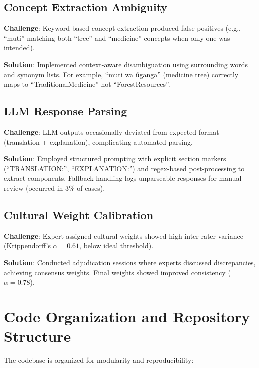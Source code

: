 \subsection{Concept Extraction Ambiguity}
\label{subsec:concept_ambiguity}

\textbf{Challenge}: Keyword-based concept extraction produced false positives (e.g., ``muti'' matching both ``tree'' and ``medicine'' concepts when only one was intended).

\textbf{Solution}: Implemented context-aware disambiguation using surrounding words and synonym lists. For example, ``muti wa ũganga'' (medicine tree) correctly maps to ``TraditionalMedicine'' not ``ForestResources''.

\subsection{LLM Response Parsing}
\label{subsec:response_parsing}

\textbf{Challenge}: LLM outputs occasionally deviated from expected format (translation + explanation), complicating automated parsing.

\textbf{Solution}: Employed structured prompting with explicit section markers (``TRANSLATION:'', ``EXPLANATION:'') and regex-based post-processing to extract components. Fallback handling logs unparseable responses for manual review (occurred in 3\% of cases).

\subsection{Cultural Weight Calibration}
\label{subsec:weight_calibration}

\textbf{Challenge}: Expert-assigned cultural weights showed high inter-rater variance (Krippendorff's $\alpha = 0.61$, below ideal threshold).

\textbf{Solution}: Conducted adjudication sessions where experts discussed discrepancies, achieving consensus weights. Final weights showed improved consistency ($\alpha = 0.78$).

\section{Code Organization and Repository Structure}
\label{sec:code_organization}

The codebase is organized for modularity and reproducibility:

